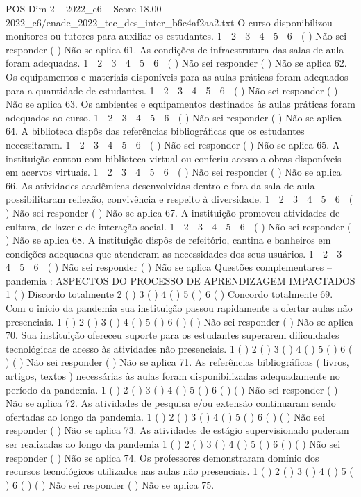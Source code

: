 \begin{textsample}{POS Dim 2 – 2022\_c6 – Score 18.00 – 2022\_c6/enade\_2022\_tec\_des\_inter\_b6c4af2aa2.txt}
O curso disponibilizou monitores ou tutores para auxiliar os estudantes. 1 ⃝ 2 ⃝ 3 ⃝ 4 ⃝ 5 ⃝ 6 ⃝ ( ) Não sei responder ( ) Não se aplica 61.
As condições de infraestrutura das salas de aula foram adequadas. 1 ⃝ 2 ⃝ 3 ⃝ 4 ⃝ 5 ⃝ 6 ⃝ ( ) Não sei responder ( ) Não se aplica 62.
Os equipamentos e materiais disponíveis para as aulas práticas foram adequados para a quantidade de estudantes. 1 ⃝ 2 ⃝ 3 ⃝ 4 ⃝ 5 ⃝ 6 ⃝ ( ) Não sei responder ( ) Não se aplica 63.
Os ambientes e equipamentos destinados às aulas práticas foram adequados ao curso. 1 ⃝ 2 ⃝ 3 ⃝ 4 ⃝ 5 ⃝ 6 ⃝ ( ) Não sei responder ( ) Não se aplica 64.
A biblioteca dispôs das referências bibliográficas que os estudantes necessitaram. 1 ⃝ 2 ⃝ 3 ⃝ 4 ⃝ 5 ⃝ 6 ⃝ ( ) Não sei responder ( ) Não se aplica 65.
A instituição contou com biblioteca virtual ou conferiu acesso a obras disponíveis em acervos virtuais. 1 ⃝ 2 ⃝ 3 ⃝ 4 ⃝ 5 ⃝ 6 ⃝ ( ) Não sei responder ( ) Não se aplica 66.
As atividades acadêmicas desenvolvidas dentro e fora da sala de aula possibilitaram reflexão, convivência e respeito à diversidade. 1 ⃝ 2 ⃝ 3 ⃝ 4 ⃝ 5 ⃝ 6 ⃝ ( ) Não sei responder ( ) Não se aplica 67.
A instituição promoveu atividades de cultura, de lazer e de interação social. 1 ⃝ 2 ⃝ 3 ⃝ 4 ⃝ 5 ⃝ 6 ⃝ ( ) Não sei responder ( ) Não se aplica 68.
A instituição dispôs de refeitório, cantina e banheiros em condições adequadas que atenderam as necessidades dos seus usuários. 1 ⃝ 2 ⃝ 3 ⃝ 4 ⃝ 5 ⃝ 6 ⃝ ( ) Não sei responder ( ) Não se aplica Questões complementares – pandemia : ASPECTOS DO PROCESSO DE APRENDIZAGEM IMPACTADOS 1 ( ) Discordo totalmente 2 ( ) 3 ( ) 4 ( ) 5 ( ) 6 ( ) Concordo totalmente 69.
Com o início da pandemia sua instituição passou rapidamente a ofertar aulas não presenciais. 1 ( ) 2 ( ) 3 ( ) 4 ( ) 5 ( ) 6 ( ) ( ) Não sei responder ( ) Não se aplica 70.
Sua instituição ofereceu suporte para os estudantes superarem dificuldades tecnológicas de acesso às atividades não presenciais. 1 ( ) 2 ( ) 3 ( ) 4 ( ) 5 ( ) 6 ( ) ( ) Não sei responder ( ) Não se aplica 71.
As referências bibliográficas ( livros, artigos, textos ) necessárias às aulas foram disponibilizadas adequadamente no período da pandemia. 1 ( ) 2 ( ) 3 ( ) 4 ( ) 5 ( ) 6 ( ) ( ) Não sei responder ( ) Não se aplica 72.
As atividades de pesquisa e/ou extensão continuaram sendo ofertadas ao longo da pandemia. 1 ( ) 2 ( ) 3 ( ) 4 ( ) 5 ( ) 6 ( ) ( ) Não sei responder ( ) Não se aplica 73.
As atividades de estágio supervisionado puderam ser realizadas ao longo da pandemia 1 ( ) 2 ( ) 3 ( ) 4 ( ) 5 ( ) 6 ( ) ( ) Não sei responder ( ) Não se aplica 74.
Os professores demonstraram domínio dos recursos tecnológicos utilizados nas aulas não presenciais. 1 ( ) 2 ( ) 3 ( ) 4 ( ) 5 ( ) 6 ( ) ( ) Não sei responder ( ) Não se aplica 75.

\end{textsample}
